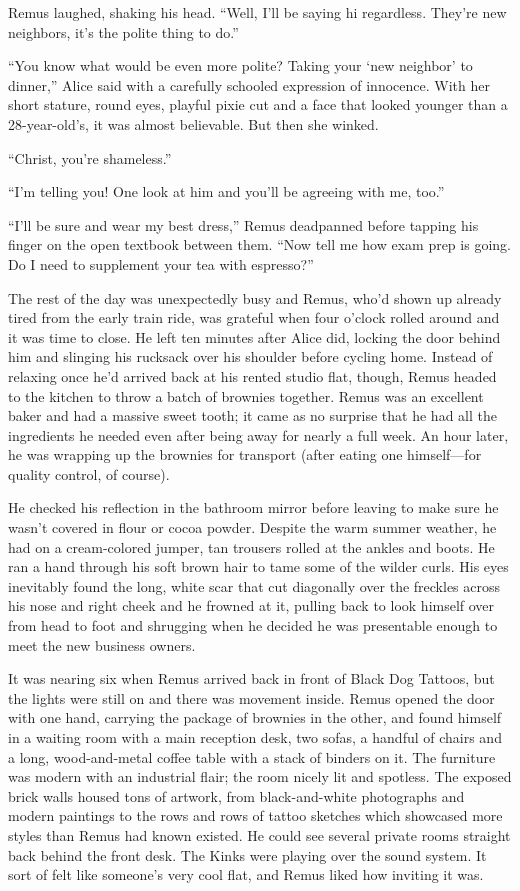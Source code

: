 Remus laughed, shaking his head. “Well, I’ll be saying hi regardless. They’re new neighbors, it’s the polite thing to do.”

“You know what would be even more polite? Taking your ‘new neighbor’ to dinner,” Alice said with a carefully schooled expression of innocence. With her short stature, round eyes, playful pixie cut and a face that looked younger than a 28-year-old’s, it was almost believable. But then she winked.

“Christ, you’re shameless.”

“I’m telling you! One look at him and you’ll be agreeing with me, too.”

“I’ll be sure and wear my best dress,” Remus deadpanned before tapping his finger on the open textbook between them. “Now tell me how exam prep is going. Do I need to supplement your tea with espresso?”

The rest of the day was unexpectedly busy and Remus, who’d shown up already tired from the early train ride, was grateful when four o’clock rolled around and it was time to close. He left ten minutes after Alice did, locking the door behind him and slinging his rucksack over his shoulder before cycling home. Instead of relaxing once he’d arrived back at his rented studio flat, though, Remus headed to the kitchen to throw a batch of brownies together. Remus was an excellent baker and had a massive sweet tooth; it came as no surprise that he had all the ingredients he needed even after being away for nearly a full week. An hour later, he was wrapping up the brownies for transport (after eating one himself—for quality control, of course).

He checked his reflection in the bathroom mirror before leaving to make sure he wasn’t covered in flour or cocoa powder. Despite the warm summer weather, he had on a cream-colored jumper, tan trousers rolled at the ankles and boots. He ran a hand through his soft brown hair to tame some of the wilder curls. His eyes inevitably found the long, white scar that cut diagonally over the freckles across his nose and right cheek and he frowned at it, pulling back to look himself over from head to foot and shrugging when he decided he was presentable enough to meet the new business owners.

It was nearing six when Remus arrived back in front of Black Dog Tattoos, but the lights were still on and there was movement inside. Remus opened the door with one hand, carrying the package of brownies in the other, and found himself in a waiting room with a main reception desk, two sofas, a handful of chairs and a long, wood-and-metal coffee table with a stack of binders on it. The furniture was modern with an industrial flair; the room nicely lit and spotless. The exposed brick walls housed tons of artwork, from black-and-white photographs and modern paintings to the rows and rows of tattoo sketches which showcased more styles than Remus had known existed. He could see several private rooms straight back behind the front desk. The Kinks were playing over the sound system. It sort of felt like someone’s very cool flat, and Remus liked how inviting it was.

